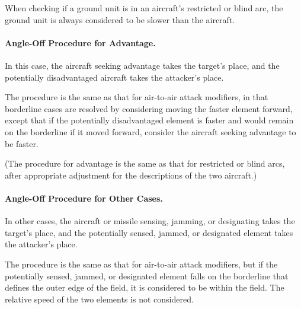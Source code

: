 {When checking if a ground unit is in an aircraft's restricted or blind arc, the ground unit is always considered to be slower than the aircraft.

\paragraph{Angle-Off Procedure for Advantage.}
In this case, the aircraft seeking advantage takes the target's place, and the potentially disadvantaged aircraft takes the attacker's place.

The procedure is the same as that for air-to-air attack modifiers, in that borderline cases are resolved by considering moving the faster element forward, except that if the potentially disadvantaged element is faster and would remain on the borderline if it moved forward, consider the aircraft seeking advantage to be faster.

(The procedure for advantage is the same as that for restricted or blind arcs, after appropriate adjustment for the descriptions of the two aircraft.)

\paragraph{Angle-Off Procedure for Other Cases.}
In other cases, the aircraft or missile sensing, jamming, or designating takes the target's place, and the potentially sensed, jammed, or designated element takes the attacker's place. 

The procedure is the same as that for air-to-air attack modifiers, but if the potentially sensed, jammed, or designated element falls on the borderline that defines the outer edge of the field, it is considered to be within the field. The relative speed of the two elements is not considered.

}

